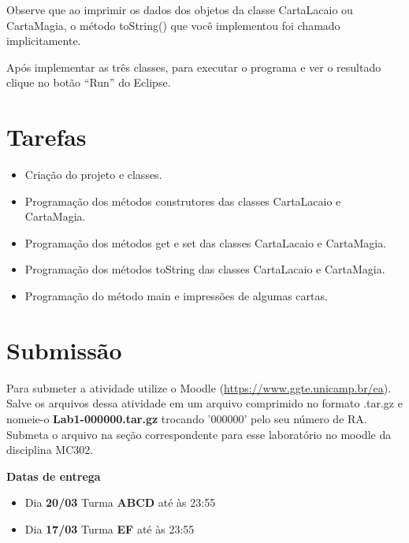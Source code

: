 \documentclass[10pt]{article}
\begin{document}


Observe que ao imprimir os dados dos objetos da classe CartaLacaio ou CartaMagia, o método toString() que você implementou foi chamado implicitamente. 

Após implementar as três classes, para executar o programa e ver o resultado clique no botão ``Run'' do Eclipse.

\section{Tarefas}

\begin{itemize}
	\item Criação do projeto e classes.
	\item Programação dos métodos construtores das classes CartaLacaio e CartaMagia.
	\item Programação dos métodos get e set das classes CartaLacaio e CartaMagia.
	\item Programação dos métodos toString das classes CartaLacaio e CartaMagia.
	\item Programação do método main e impressões de algumas cartas.
\end{itemize}

\section{Submissão}

Para submeter a atividade utilize o Moodle (\url{https://www.ggte.unicamp.br/ea}). Salve os arquivos dessa atividade em um arquivo comprimido no formato .tar.gz e nomeie-o \textbf{Lab1-000000.tar.gz} trocando '000000' pelo seu número de RA. Submeta o arquivo na seção correspondente para esse laboratório no moodle da disciplina MC302.

\textbf{Datas de entrega}
\begin{itemize}
    \item Dia \textbf{20/03} Turma \textbf{ABCD} até às 23:55
    \item Dia \textbf{17/03} Turma \textbf{EF} até às 23:55
\end{itemize}
\end{document}
